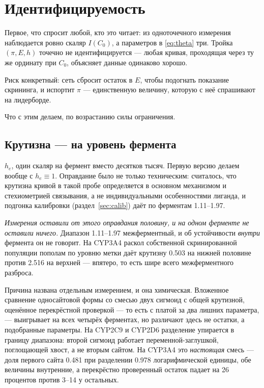 \section{Идентифицируемость}
\label{sec:ident}

Первое, что спросит любой, кто это читает: из одноточечного измерения наблюдается ровно скаляр $I(C_0)$,
а параметров в \eqref{eq:theta} три. Тройка $(\pi, E, h)$ точечно не идентифицируется --- любая кривая,
проходящая через ту же ординату при $C_0$, объясняет данные одинаково хорошо.

Риск конкретный: сеть сбросит остаток в $E$, чтобы подогнать показание скрининга, и испортит $\pi$ ---
единственную величину, которую с неё спрашивают на лидерборде.

Что с этим делаем, по возрастанию силы ограничения.

\subsection{Крутизна --- на уровень фермента}

$h_e$, один скаляр на фермент вместо десятков тысяч. Первую версию делаем вообще с $h_e \equiv 1$.
Оправдание было не только техническим: считалось, что крутизна кривой в такой пробе определяется в
основном механизмом и стехиометрией связывания, а не индивидуальными особенностями лиганда, и подгонка
калибровки (раздел~\ref{sec:calib}) даёт по ферментам 1.11--1.97.

\emph{Измерения оставили от этого оправдания половину, и на одном ферменте не оставили ничего.}
Диапазон 1.11--1.97 межферментный, и об устойчивости \emph{внутри} фермента он не говорит. На CYP3A4
раскол собственной скринированной популяции пополам по уровню метки даёт крутизну 0.503 на нижней
половине против 2.516 на верхней --- впятеро, то есть шире всего межферментного разброса.

Причина названа отдельным измерением, и она химическая. Вложенное сравнение односайтовой формы со
смесью двух сигмоид с общей крутизной, оценённое перекрёстной проверкой --- то есть с платой за два
лишних параметра, --- выигрывает на всех четырёх ферментах, но различают здесь не остатки, а
подобранные параметры. На CYP2C9 и CYP2D6 разделение упирается в границу диапазона: второй сигмоид
работает переменной-заглушкой, поглощающей хвост, а не вторым сайтом. На CYP3A4 это \emph{настоящая}
смесь --- доля первого сайта 0.481 при разделении 0.978 логарифмической единицы, обе величины
внутренние, а перекрёстно проверенный остаток падает на 26 процентов против 3--14 у остальных.

